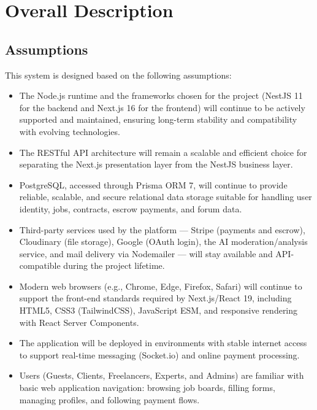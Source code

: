 \section{Overall Description}

\subsection{Assumptions}

This system is designed based on the following assumptions:
\begin{itemize}[leftmargin=*]
    \item The Node.js runtime and the frameworks chosen for the project (NestJS 11 for the backend and Next.js 16 for the frontend) will continue to be actively supported and maintained, ensuring long-term stability and compatibility with evolving technologies.
    \item The RESTful API architecture will remain a scalable and efficient choice for separating the Next.js presentation layer from the NestJS business layer.
    \item PostgreSQL, accessed through Prisma ORM 7, will continue to provide reliable, scalable, and secure relational data storage suitable for handling user identity, jobs, contracts, escrow payments, and forum data.
    \item Third-party services used by the platform --- Stripe (payments and escrow), Cloudinary (file storage), Google (OAuth login), the AI moderation/analysis service, and mail delivery via Nodemailer --- will stay available and API-compatible during the project lifetime.
    \item Modern web browsers (e.g., Chrome, Edge, Firefox, Safari) will continue to support the front-end standards required by Next.js/React 19, including HTML5, CSS3 (TailwindCSS), JavaScript ESM, and responsive rendering with React Server Components.
    \item The application will be deployed in environments with stable internet access to support real-time messaging (Socket.io) and online payment processing.
    \item Users (Guests, Clients, Freelancers, Experts, and Admins) are familiar with basic web application navigation: browsing job boards, filling forms, managing profiles, and following payment flows.
\end{itemize}

